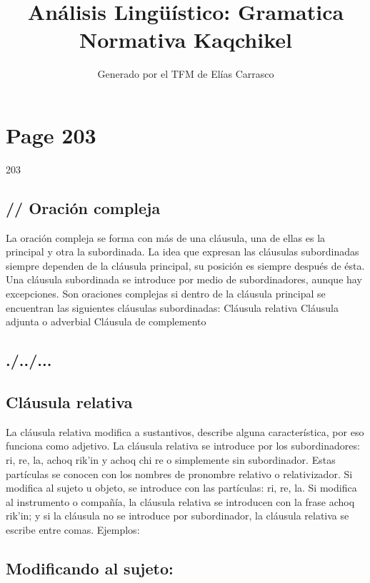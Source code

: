 \documentclass{article}%
\title{Análisis Lingüístico: Gramatica Normativa Kaqchikel}%
\author{Generado por el TFM de Elías Carrasco}%
\begin{document}
%
\normalsize%
\maketitle%
\section{Page 203}%
\label{sec:Page203}%
203 %
\subsection{// Oración compleja}%
\label{subsec://Oracincompleja}%

%
La oración compleja se forma con más de una cláusula, una de ellas es la principal y %
otra la subordinada. La idea que expresan las cláusulas subordinadas siempre dependen %
de la cláusula principal, su posición es siempre después de ésta. Una cláusula subordinada %
se introduce por medio de subordinadores, aunque hay excepciones. Son oraciones %
complejas si dentro de la cláusula principal se encuentran las siguientes cláusulas %
subordinadas: %
Cláusula relativa %
Cláusula adjunta o adverbial %
Cláusula de complemento %
\subsection{./../...}%
\label{subsec:./../...}%

%
\subsection{Cláusula relativa}%
\label{subsec:Clusularelativa}%

%
La cláusula relativa modifica a sustantivos, describe alguna característica, por eso %
funciona como adjetivo. La cláusula relativa se introduce por los subordinadores: ri, %
re, la, achoq rik'in y achoq chi re o simplemente sin subordinador. Estas partículas se %
conocen con los nombres de pronombre relativo o relativizador. Si modifica al sujeto u %
objeto, se introduce con las partículas: ri, re, la. Si modifica al instrumento o compañía, %
la cláusula relativa se introducen con la frase achoq rik'in; y si la cláusula no se %
introduce por subordinador, la cláusula relativa se escribe entre comas. Ejemplos: %
\subsection{Modificando al sujeto:}%
\label{subsec:Modificandoalsujeto}%
\end{document}
